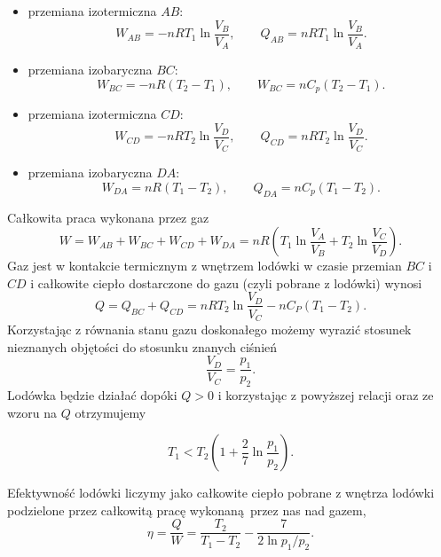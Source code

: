 \documentclass[11pt,a4paper]{article}
\begin{document}
\begin{itemize}
 	\item przemiana izotermiczna $AB$:
	\begin{equation}
		W_{AB} = - n R T_1 \ln \frac{V_B}{V_A}, \qquad Q_{AB} = n R T_1 \ln \frac{V_B}{V_A}.
	\end{equation}
	\item przemiana izobaryczna $BC$:
	\begin{equation}
		W_{BC} = - n R (T_2 - T_1), \qquad W_{BC} = n C_p (T_2 - T_1).
	\end{equation}
	\item przemiana izotermiczna $CD$:
	\begin{equation}
		W_{CD} = - n R T_2 \ln \frac{V_D}{V_C}, \qquad Q_{CD} = n R T_2 \ln \frac{V_D}{V_C}.
	\end{equation}
	\item przemiana izobaryczna $DA$:
	\begin{equation}
		W_{DA} = n R (T_1 - T_2), \qquad Q_{DA} = n C_p (T_1 - T_2).
	\end{equation}
\end{itemize}
 Całkowita praca wykonana przez gaz
 \begin{equation}
 	W = W_{AB} + W_{BC} + W_{CD} + W_{DA} =  n R \left( T_1 \ln \frac{V_A}{V_B} + T_2 \ln \frac{V_C}{V_D} \right).
 \end{equation}
 Gaz jest w kontakcie termicznym z wnętrzem lodówki w czasie przemian $BC$ i $CD$ i całkowite ciepło dostarczone do gazu (czyli pobrane z lodówki) wynosi
 \begin{equation}
 	Q = Q_{BC} + Q_{CD} = n R T_2 \ln \frac{V_D}{V_C} - n C_P (T_1 - T_2).
 \end{equation}
 Korzystając z równania stanu gazu doskonałego możemy wyrazić stosunek nieznanych objętości do stosunku znanych ciśnień
 \begin{equation}
 	\frac{V_D}{V_C} = \frac{p_1}{p_2}.
 \end{equation}
 Lodówka będzie działać dopóki $Q>0$ i korzystając z powyższej relacji oraz ze wzoru na $Q$ otrzymujemy
 
 \begin{equation}
 	T_1 < T_2\left( 1 + \frac{2}{7}\ln \frac{p_1}{p_2} \right).
 \end{equation}

Efektywność lodówki liczymy jako całkowite ciepło pobrane z wnętrza lodówki podzielone przez całkowitą pracę wykonaną przez nas nad gazem,
\begin{equation}
	\eta = \frac{Q}{W} = \frac{T_2}{T_1 - T_2} - \frac{7}{2 \ln p_1/p_2}.
\end{equation}
 
\end{document}
